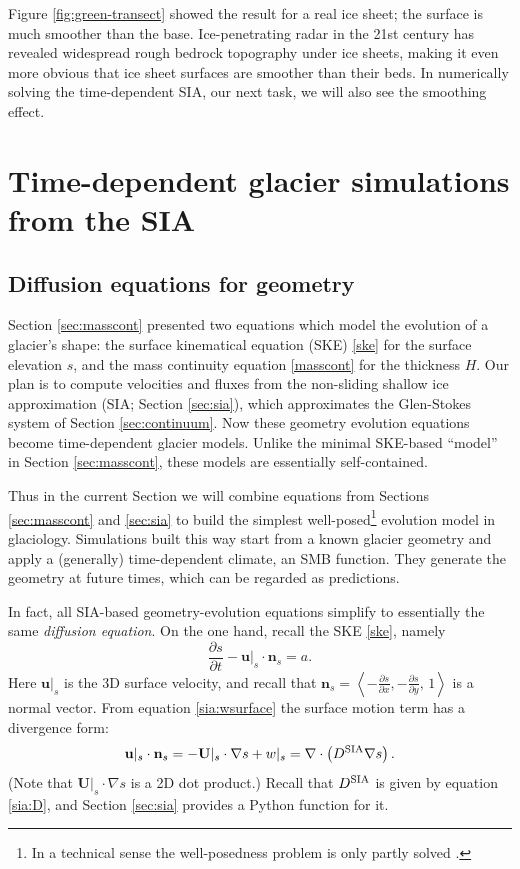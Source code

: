 \documentclass[letterpaper,final,12pt,reqno]{amsart}
\newcommand{\bn}{\mathbf{n}}
\newcommand{\bu}{\mathbf{u}}
\newcommand{\bU}{\mathbf{U}}
\newcommand{\grad}{\nabla}
\newcommand{\Div}{\nabla\cdot}
\newcommand{\Dsia}{D^{\text{\textrm{SIA}}}}
\begin{document}
Figure \ref{fig:green-transect} showed the result for a real ice sheet; the surface is much smoother than the base.  Ice-penetrating radar in the 21st century has revealed widespread rough bedrock topography under ice sheets, making it even more obvious that ice sheet surfaces are smoother than their beds.  In numerically solving the time-dependent SIA, our next task, we will also see the smoothing effect.


\section{Time-dependent glacier simulations from the SIA}  \label{sec:evolution}

\subsection*{Diffusion equations for geometry}  Section \ref{sec:masscont} presented two equations which model the evolution of a glacier's shape: the surface kinematical equation (SKE) \eqref{ske} for the surface elevation $s$, and the mass continuity equation \eqref{masscont} for the thickness $H$.  Our plan is to compute velocities and fluxes from the non-sliding shallow ice approximation (SIA; Section \ref{sec:sia}), which approximates the Glen-Stokes system of Section \ref{sec:continuum}.  Now these geometry evolution equations become time-dependent glacier models.  Unlike the minimal SKE-based ``model'' in Section \ref{sec:masscont}, these models are essentially self-contained.

Thus in the current Section we will combine equations from Sections \ref{sec:masscont} and \ref{sec:sia} to build the simplest well-posed\footnote{In a technical sense the well-posedness problem is only partly solved \cite{JouvetBueler2012}.} evolution model in glaciology.  Simulations built this way start from a known glacier geometry and apply a (generally) time-dependent climate, an SMB function.  They generate the geometry at future times, which can be regarded as predictions.

In fact, all SIA-based geometry-evolution equations simplify to essentially the same \emph{diffusion equation}.  On the one hand, recall the SKE \eqref{ske}, namely
\begin{equation}
\frac{\partial s}{\partial t} - \bu|_s \cdot \bn_s = a.  \label{skeagain}
\end{equation}
Here $\bu|_s$ is the 3D surface velocity, and recall that $\bn_s = \left<-\frac{\partial s}{\partial x}, -\frac{\partial s}{\partial y}, \,1\right>$ is a normal vector.  From equation \eqref{sia:wsurface} the surface motion term has a divergence form:
	$$\bu|_s \cdot \bn_s = -\bU|_s \cdot \grad s + w|_s = \Div\left(\Dsia \grad s\right).$$
(Note that $\bU|_s \cdot \grad s$ is a 2D dot product.)  Recall that $\Dsia$ is given by equation \eqref{sia:D}, and Section \ref{sec:sia} provides a Python function for it.
\end{document}

